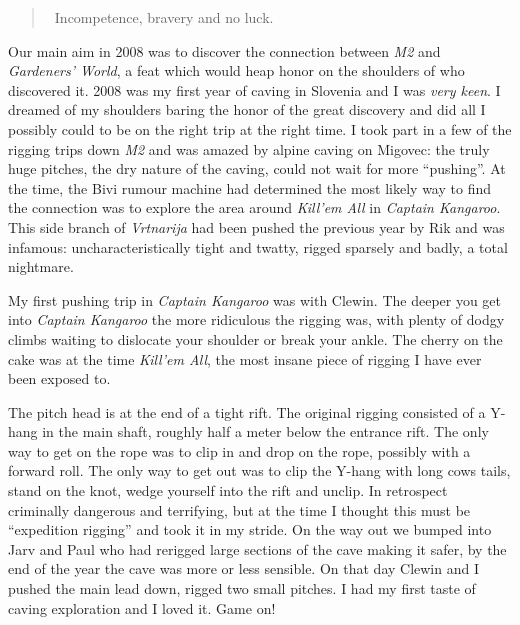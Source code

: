 \begin{quote} Incompetence, bravery and no luck. \end{quote}

Our main aim in 2008 was to discover the connection between \emph{M2}
and \emph{Gardeners' World}, a feat which would heap honor on the
shoulders of who discovered it. 2008 was my first year of caving in
Slovenia and I was \textit{very keen}. I dreamed of my shoulders baring
the honor of the great discovery and did all I possibly could to be on
the right trip at the right time. I took part in a few of the rigging
trips down \emph{M2} and was amazed by alpine caving on Migovec: the
truly huge pitches, the dry nature of the caving, could not wait for
more ``pushing''. At the time, the Bivi rumour machine had determined
the most likely way to find the connection was to explore the area
around \emph{Kill'em All} in \emph{Captain Kangaroo}. This side branch
of \emph{Vrtnarija} had been pushed the previous year by Rik and was
infamous: uncharacteristically tight and twatty, rigged sparsely and
badly, a total nightmare.

My first pushing trip in \emph{Captain Kangaroo} was with Clewin. The
deeper you get into \emph{Captain Kangaroo} the more ridiculous the
rigging was, with plenty of dodgy climbs waiting to dislocate your
shoulder or break your ankle. The cherry on the cake was at the time
\emph{Kill'em All}, the most insane piece of rigging I have ever been
exposed to.

The pitch head is at the end of a tight rift. The original rigging
consisted of a Y-hang in the main shaft, roughly half a meter below the
entrance rift. The only way to get on the rope was to clip in and drop
on the rope, possibly with a forward roll. The only way to get out was
to clip the Y-hang with long cows tails, stand on the knot, wedge
yourself into the rift and unclip. In retrospect criminally dangerous
and terrifying, but at the time I thought this must be ``expedition
rigging'' and took it in my stride. On the way out we bumped into Jarv
and Paul who had rerigged large sections of the cave making it safer, by
the end of the year the cave was more or less sensible. On that day
Clewin and I pushed the main lead down, rigged two small pitches. I had
my first taste of caving exploration and I loved it. Game on!

